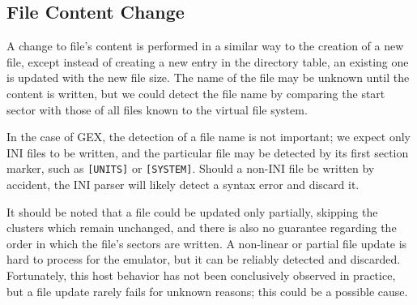 \subsection{File Content Change}

A change to file's content is performed in a similar way to the creation of a new file, except instead of creating a new entry in the directory table, an existing one is updated with the new file size. The name of the file may be unknown until the content is written, but we could detect the file name by comparing the start sector with those of all files known to the virtual file system.

In the case of GEX, the detection of a file name is not important; we expect only INI files to be written, and the particular file may be detected by its first section marker, such as \verb|[UNITS]| or \verb|[SYSTEM]|. Should a non-INI file be written by accident, the INI parser will likely detect a syntax error and discard it.

It should be noted that a file could be updated only partially, skipping the clusters which remain unchanged, and there is also no guarantee regarding the order in which the file's sectors are written. A non-linear or partial file update is hard to process for the emulator, but it can be reliably detected and discarded. Fortunately, this host behavior has not been conclusively observed in practice, but a file update rarely fails for unknown reasons; this could be a possible cause.












